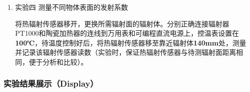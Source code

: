 \documentclass[dvipsnames, svgnames,a4paper,11pt]{article}
\begin{document}
\begin{enumerate}
\begin{enumerate}
			\item 移动红外传感器的位置，每移动一定的距离后，记录测得对应辐射强度，绘制$P-d^{2}$图。			
		\end{enumerate}
		
		\item 实验四 测量不同物体表面的发射系数
		
		将热辐射传感器移开，更换所需辐射面的辐射体。分别正确连接辐射器PT1000和陶瓷加热器的连线到万用表和可编程直流电源上，控温表设置在\textbf{100℃}，待温度控制好后，将热辐射传感器移至靠近辐射体\textbf{140mm}处，测量并记录该辐射传感器读数（实验时，保证热辐射传感器与待测辐射面距离相同，便于分析和比较）。
	\end{enumerate}	
	
	\subsubsection{实验结果展示（Display）}
\end{document}
